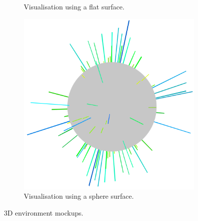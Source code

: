 
\begin{figure}[H]
    \newcommand{\figurewidth}{0.496\textwidth}
    \newcommand{\figureheight}{3cm}
	\centering
	\begin{subfigure}[b]{\figurewidth}
        \caption{Visualisation using a flat surface.}
        \label{fig:visualisation_flat}
    \end{subfigure}
    \begin{subfigure}[b]{\figurewidth}
        \includegraphics[width=\textwidth]{images/design/mockups/sphere}
        \caption{Visualisation using a sphere surface.}
        \label{fig:visualisation_sphere}
    \end{subfigure}
	\caption[3D environment mockups]{3D environment mockups.}
	\label{fig:environment_mockups}
\end{figure}
